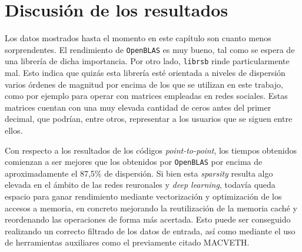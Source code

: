 \section{Discusión de los resultados}
Los datos mostrados hasta el momento en este capítulo son cuanto menos sorprendentes. El rendimiento de \texttt{OpenBLAS} es muy bueno, tal como se espera de una librería de dicha importancia. Por otro lado, \texttt{librsb} rinde particularmente mal. Esto indica que quizás esta librería esté orientada a niveles de dispersión varios órdenes de magnitud por encima de los que se utilizan en este trabajo, como por ejemplo para operar con matrices empleadas en redes sociales. Estas matrices cuentan con una muy elevada cantidad de ceros antes del primer decimal, que podrían, entre otros, representar a los usuarios que se siguen entre ellos.

Con respecto a los resultados de los códigos \textit{point-to-point}, los tiempos obtenidos comienzan a ser mejores que los obtenidos por \texttt{OpenBLAS} por encima de aproximadamente el 87,5\% de dispersión. Si bien esta \textit{sparsity} resulta algo elevada en el ámbito de las redes reuronales y \textit{deep learning}, todavía queda espacio para ganar rendimiento mediante vectorización y optimización de los accesos a memoria, en concreto mejorando la reutilización de la memoria caché y reordenando las operaciones de forma más acertada. Esto puede ser conseguido realizando un correcto filtrado de los datos de entrada, así como mediante el uso de herramientas auxiliares como el previamente citado MACVETH.